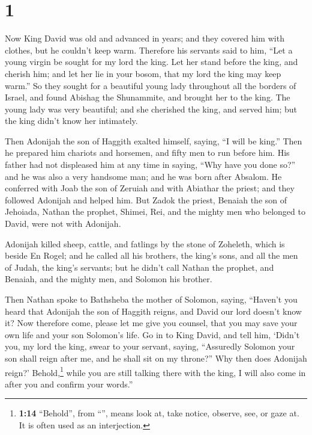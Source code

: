 \hypertarget{section}{%
\section{1}\label{section}}

 Now King David was old and advanced in years; and they
covered him with clothes, but he couldn't keep warm. 
Therefore his servants said to him, ``Let a young virgin be sought for
my lord the king. Let her stand before the king, and cherish him; and
let her lie in your bosom, that my lord the king may keep warm.''
 So they sought for a beautiful young lady throughout all
the borders of Israel, and found Abishag the Shunammite, and brought her
to the king.  The young lady was very beautiful; and she
cherished the king, and served him; but the king didn't know her
intimately.

 Then Adonijah the son of Haggith exalted himself, saying,
``I will be king.'' Then he prepared him chariots and horsemen, and
fifty men to run before him.  His father had not
displeased him at any time in saying, ``Why have you done so?'' and he
was also a very handsome man; and he was born after Absalom.
 He conferred with Joab the son of Zeruiah and with
Abiathar the priest; and they followed Adonijah and helped him.
 But Zadok the priest, Benaiah the son of Jehoiada, Nathan
the prophet, Shimei, Rei, and the mighty men who belonged to David, were
not with Adonijah.

 Adonijah killed sheep, cattle, and fatlings by the stone
of Zoheleth, which is beside En Rogel; and he called all his brothers,
the king's sons, and all the men of Judah, the king's servants;
 but he didn't call Nathan the prophet, and Benaiah, and
the mighty men, and Solomon his brother.

 Then Nathan spoke to Bathsheba the mother of Solomon,
saying, ``Haven't you heard that Adonijah the son of Haggith reigns, and
David our lord doesn't know it?  Now therefore come,
please let me give you counsel, that you may save your own life and your
son Solomon's life.  Go in to King David, and tell him,
`Didn't you, my lord the king, swear to your servant, saying,
``Assuredly Solomon your son shall reign after me, and he shall sit on
my throne?'' Why then does Adonijah reign?' 
Behold,\footnote{\textbf{1:14} ``Behold'', from ``'', means
  look at, take notice, observe, see, or gaze at. It is often used as an
  interjection.} while you are still talking there with the king, I will
also come in after you and confirm your words.''

